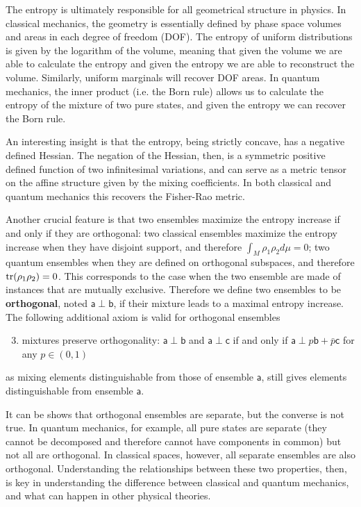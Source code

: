 \documentclass[10pt,twocolumn, nofootinbib]{revtex4-2}
\newcommand{\ens}[1][e] {\mathsf{#1}} %
\def\ortho{\perp}
\begin{document}
The entropy is ultimately responsible for all geometrical structure in physics. In classical mechanics, the geometry is essentially defined by phase space volumes and areas in each degree of freedom (DOF). The entropy of uniform distributions is given by the logarithm of the volume, meaning that given the volume we are able to calculate the entropy and given the entropy we are able to reconstruct the volume. Similarly, uniform marginals will recover DOF areas. In quantum mechanics, the inner product (i.e. the Born rule) allows us to calculate the entropy of the mixture of two pure states, and given the entropy we can recover the Born rule.

An interesting insight is that the entropy, being strictly concave, has a negative defined Hessian. The negation of the Hessian, then, is a symmetric positive defined function of two infinitesimal variations, and can serve as a metric tensor on the affine structure given by the mixing coefficients. In both classical and quantum mechanics this recovers the Fisher-Rao metric.

Another crucial feature is that two ensembles maximize the entropy increase if and only if they are orthogonal: two classical ensembles maximize the entropy increase when they have disjoint support, and therefore $\int_M \rho_1 \rho_2 d\mu = 0$; two quantum ensembles when they are defined on orthogonal subspaces, and therefore $\operatorname{tr}(\rho_1 \rho_2) = 0$. This corresponds to the case when the two ensemble are made of instances that are mutually exclusive. Therefore we define two ensembles to be \textbf{orthogonal}, noted $\ens[a] \ortho \ens[b]$, if their mixture leads to a maximal entropy increase. The following additional axiom is valid for orthogonal ensembles
\begin{enumerate}
	\setcounter{enumi}{2}
	\item mixtures preserve orthogonality: $\ens[a] \ortho \ens[b]$ and $\ens[a] \ortho \ens[c]$ if and only if $\ens[a] \ortho p \ens[b] + \bar{p} \ens[c]$ for any $p \in (0,1)$
\end{enumerate}
as mixing elements distinguishable from those of ensemble $\ens[a]$, still gives elements distinguishable from ensemble $\ens[a]$.

It can be shows that orthogonal ensembles are separate, but the converse is not true. In quantum mechanics, for example, all pure states are separate (they cannot be decomposed and therefore cannot have components in common) but not all are orthogonal. In classical spaces, however, all separate ensembles are also orthogonal. Understanding the relationships between these two properties, then, is key in understanding the difference between classical and quantum mechanics, and what can happen in other physical theories.
\end{document}
